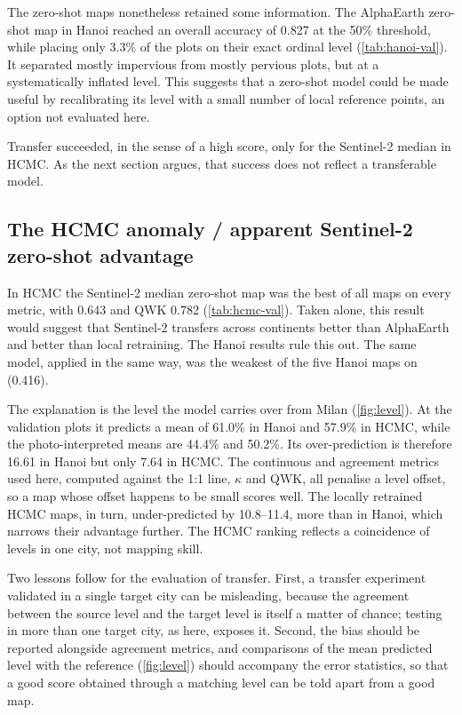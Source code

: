 The zero-shot maps nonetheless retained some information. The AlphaEarth
zero-shot map in Hanoi reached an overall accuracy of 0.827 at the 50\%
threshold, while placing only 3.3\% of the plots on their exact ordinal
level (\cref{tab:hanoi-val}). It separated mostly impervious from mostly
pervious plots, but at a systematically inflated level. This suggests that
a zero-shot model could be made useful by recalibrating its level with a
small number of local reference points, an option not evaluated here.

Transfer succeeded, in the sense of a high score, only for the Sentinel-2
median in HCMC. As the next section argues, that success does not reflect
a transferable model.

\subsection{The HCMC anomaly / apparent Sentinel-2 zero-shot advantage}
\label{sec:disc-hcmc}

In HCMC the Sentinel-2 median zero-shot map was the best of all maps on
every metric, with \Rsq{} 0.643 and QWK 0.782 (\cref{tab:hcmc-val}). Taken
alone, this result would suggest that Sentinel-2 transfers across
continents better than AlphaEarth and better than local retraining. The
Hanoi results rule this out. The same model, applied in the same way, was
the weakest of the five Hanoi maps on \Rsq{} (0.416).

The explanation is the level the model carries over from Milan
(\cref{fig:level}). At the validation plots it predicts a mean of 61.0\% in
Hanoi and 57.9\% in HCMC, while the photo-interpreted means are 44.4\% and
50.2\%. Its over-prediction is therefore 16.61\pp{} in Hanoi but only
7.64\pp{} in HCMC. The continuous and agreement metrics used here, \Rsq{}
computed against the 1:1 line, $\kappa$ and QWK, all penalise a level
offset, so a map whose offset happens to be small scores well. The locally
retrained HCMC maps, in turn, under-predicted by 10.8--11.4\pp, more than
in Hanoi, which narrows their advantage further. The HCMC ranking reflects a
coincidence of levels in one city, not mapping skill.

Two lessons follow for the evaluation of transfer. First, a transfer
experiment validated in a single target city can be misleading, because the
agreement between the source level and the target level is itself a matter
of chance; testing in more than one target city, as here, exposes it.
Second, the bias should be reported alongside agreement metrics, and
comparisons of the mean predicted level with the reference
(\cref{fig:level}) should accompany the error statistics, so that a good
score obtained through a matching level can be told apart from a good
map.

